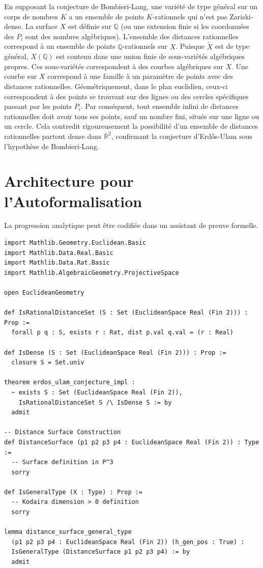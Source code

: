 \documentclass[12pt,a4paper]{article}
\begin{document}
En supposant la conjecture de Bombieri-Lang, une vari\'et\'e de type g\'en\'eral sur un corps de nombres $K$ a un ensemble de points $K$-rationnels qui n'est pas Zariski-dense.
La surface $X$ est d\'efinie sur $\mathbb{Q}$ (ou une extension finie si les coordonn\'ees des $P_i$ sont des nombres alg\'ebriques). L'ensemble des distances rationnelles correspond \`a un ensemble de points $\mathbb{Q}$-rationnels sur $X$.
Puisque $\tilde{X}$ est de type g\'en\'eral, $X(\mathbb{Q})$ est contenu dans une union finie de sous-vari\'et\'es alg\'ebriques propres. Ces sous-vari\'et\'es correspondent \`a des courbes alg\'ebriques sur $X$.
Une courbe sur $X$ correspond \`a une famille \`a un param\`etre de points avec des distances rationnelles. G\'eom\'etriquement, dans le plan euclidien, ceux-ci correspondent \`a des points se trouvant sur des lignes ou des cercles sp\'ecifiques passant par les points $P_i$.
Par cons\'equent, tout ensemble infini de distances rationnelles doit avoir tous ses points, sauf un nombre fini, situ\'es sur une ligne ou un cercle. Cela contredit rigoureusement la possibilit\'e d'un ensemble de distances rationnelles partout dense dans $\mathbb{R}^2$, confirmant la conjecture d'Erd\H{o}s-Ulam sous l'hypoth\`ese de Bombieri-Lang.

\section{Architecture pour l'Autoformalisation}

La progression analytique peut \^etre codifi\'ee dans un assistant de preuve formelle.

\begin{lstlisting}[basicstyle=\ttfamily\small, breaklines=true]
import Mathlib.Geometry.Euclidean.Basic
import Mathlib.Data.Real.Basic
import Mathlib.Data.Rat.Basic
import Mathlib.AlgebraicGeometry.ProjectiveSpace

open EuclideanGeometry

def IsRationalDistanceSet (S : Set (EuclideanSpace Real (Fin 2))) : Prop :=
  forall p q : S, exists r : Rat, dist p.val q.val = (r : Real)

def IsDense (S : Set (EuclideanSpace Real (Fin 2))) : Prop :=
  closure S = Set.univ

theorem erdos_ulam_conjecture_impl :
  ~ exists S : Set (EuclideanSpace Real (Fin 2)),
    IsRationalDistanceSet S /\ IsDense S := by
  admit

-- Distance Surface Construction
def DistanceSurface (p1 p2 p3 p4 : EuclideanSpace Real (Fin 2)) : Type :=
  -- Surface definition in P^3
  sorry

def IsGeneralType (X : Type) : Prop :=
  -- Kodaira dimension > 0 definition
  sorry

lemma distance_surface_general_type
  (p1 p2 p3 p4 : EuclideanSpace Real (Fin 2)) (h_gen_pos : True) :
  IsGeneralType (DistanceSurface p1 p2 p3 p4) := by
  admit
\end{lstlisting}
\end{document}
